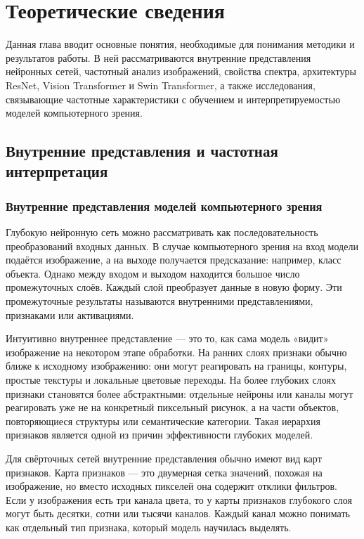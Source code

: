 \chapter{Теоретические сведения}

Данная глава вводит основные понятия, необходимые для понимания методики и результатов работы. В ней рассматриваются внутренние представления нейронных сетей, частотный анализ изображений, свойства спектра, архитектуры ResNet, Vision Transformer и Swin Transformer, а также исследования, связывающие частотные характеристики с обучением и интерпретируемостью моделей компьютерного зрения.

\section{Внутренние представления и частотная интерпретация}

\subsection{Внутренние представления моделей компьютерного зрения}

Глубокую нейронную сеть можно рассматривать как последовательность преобразований входных данных. В случае компьютерного зрения на вход модели подаётся изображение, а на выходе получается предсказание: например, класс объекта. Однако между входом и выходом находится большое число промежуточных слоёв. Каждый слой преобразует данные в новую форму. Эти промежуточные результаты называются внутренними представлениями, признаками или активациями.

Интуитивно внутреннее представление — это то, как сама модель «видит» изображение на некотором этапе обработки. На ранних слоях признаки обычно ближе к исходному изображению: они могут реагировать на границы, контуры, простые текстуры и локальные цветовые переходы. На более глубоких слоях признаки становятся более абстрактными: отдельные нейроны или каналы могут реагировать уже не на конкретный пиксельный рисунок, а на части объектов, повторяющиеся структуры или семантические категории. Такая иерархия признаков является одной из причин эффективности глубоких моделей.

Для свёрточных сетей внутренние представления обычно имеют вид карт признаков. Карта признаков — это двумерная сетка значений, похожая на изображение, но вместо исходных пикселей она содержит отклики фильтров. Если у изображения есть три канала цвета, то у карты признаков глубокого слоя могут быть десятки, сотни или тысячи каналов. Каждый канал можно понимать как отдельный тип признака, который модель научилась выделять.

